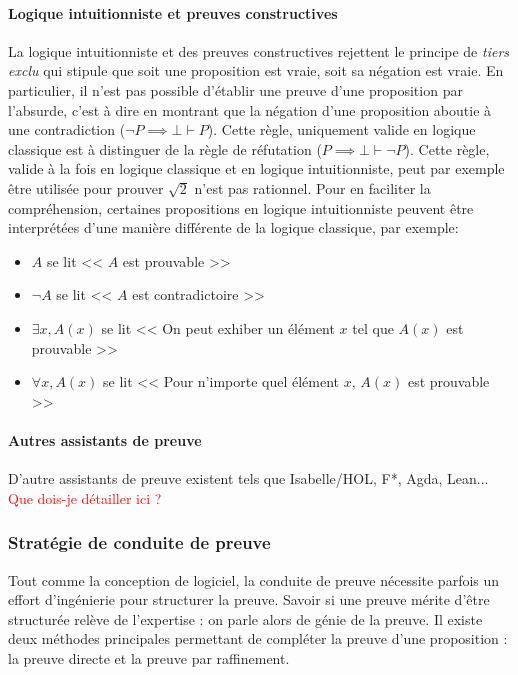 			\paragraph{Logique intuitionniste et preuves constructives} La logique intuitionniste et des preuves constructives rejettent le principe de \emph{tiers exclu} qui stipule que soit une proposition est vraie, soit sa négation est vraie. En particulier, il n'est pas possible d'établir une preuve d'une proposition par l'absurde, c'est à dire en montrant que la négation d'une proposition aboutie à une contradiction ($ \neg P \implies \bot \vdash P$). Cette règle, uniquement valide en logique classique est à distinguer de la règle de réfutation ($P \implies \bot \vdash \neg P$). Cette règle, valide à la fois en logique classique et en logique intuitionniste, peut par exemple être utilisée pour prouver $\sqrt{2}$ n'est pas rationnel.
			Pour en faciliter la compréhension, certaines propositions en logique intuitionniste peuvent être interprétées d'une manière différente de la logique classique, par exemple:
			\begin{itemize}
				\item{$A$ se lit << $A$ est prouvable >>}
				\item{$\neg A$ se lit << $A$ est contradictoire >>}
				\item{$\exists x, A(x)$ se lit << On peut exhiber un élément $x$ tel que $A(x)$ est prouvable >>}
				\item{$\forall x, A(x)$ se lit << Pour n'importe quel élément $x$, $A(x)$ est prouvable >>}
			\end{itemize}

			\paragraph{Autres assistants de preuve} D'autre assistants de preuve existent tels que Isabelle/HOL, F*, Agda, Lean... \textcolor{red}{Que dois-je détailler ici ?}

			\subsubsection{Stratégie de conduite de preuve}
			Tout comme la conception de logiciel, la conduite de preuve nécessite parfois un effort d'ingénierie pour structurer la preuve. Savoir si une preuve mérite d'être structurée relève  de l'expertise : on parle alors de génie de la preuve. Il existe deux méthodes principales permettant de compléter la preuve d'une proposition : la preuve directe et la preuve par raffinement.

